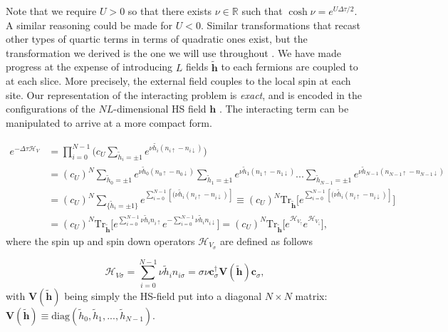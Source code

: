 Note that we require $U > 0$ so that there exists $\nu \in \mathbb{R}$ such that $\cosh \nu = e^{U\Delta \tau / 2}$. A similar reasoning could be made for $U < 0$.
Similar transformations that recast other types of quartic terms in terms of quadratic ones exist, but the transformation we derived is the one we will use throughout \cite{hirsch_monte_1983}.
We have made progress at the expense of introducing $L$ fields $\widetilde{\bm h}$ to each fermions are coupled to at each slice.
More precisely, the external field couples to the local spin at each site.
Our representation of the interacting problem is \emph{exact}, and is encoded in the configurations of the $NL$-dimensional HS field $\bm h$  \cite{hou_numerical_2009}.
The interacting term can be manipulated to arrive at a more compact form.

\begin{equation}\label{eq:exp_quartic}
\begin{split}
e^{-\Delta\tau \mathcal{H}_V} &= \prod_{i=0}^{N-1} \bigg( c_U \sum_{\widetilde{h}_i = \pm 1} e^{\nu \widetilde{h_i} ( n_{i\uparrow} - n_{i\downarrow} )} \bigg) \\
&=  (c_U)^N \sum_{\widetilde{h}_0 = \pm 1} e^{\nu \widetilde{h}_0 ( n_{0\uparrow} - n_{0\downarrow} )} \sum_{\widetilde{h}_1 = \pm 1} e^{\nu \widetilde{h}_1 ( n_{1\uparrow} - n_{1\downarrow} )} ... \sum_{\widetilde{h}_{N-1} = \pm 1} e^{\nu \widetilde{h}_{N-1} ( n_{N-1\uparrow} - n_{N-1\downarrow} )} \\
&= (c_U)^N \sum_{ \{ \widetilde{h}_i = \pm 1 \}} e^{\sum_{i=0}^{N-1} [(\nu \widetilde{h}_i ( n_{i\uparrow} - n_{i\downarrow} ) ]} \equiv (c_U)^N \text{Tr}_{\widetilde{\bm h}} \bigg[ e^{\sum_{i=0}^{N-1} [(\nu \widetilde{h}_i ( n_{i\uparrow} - n_{i\downarrow} ) ]} \bigg] \\
&= (c_U)^N \text{Tr}_{\widetilde{\bm h}} \bigg[ e^{\sum_{i=0}^{N-1} \nu \widetilde{h}_i n_{i\uparrow}} e^{-\sum_{i=0}^{N-1} \nu \widetilde{h}_i n_{i\downarrow}} \bigg] = (c_U)^N \text{Tr}_{\widetilde{\bm h}} \bigg[ e^{\mathcal{H}_{V_\uparrow}} e^{\mathcal{H}_{V_\downarrow}} \bigg] ,
\end{split}
\end{equation}
where the spin up and spin down operators $\mathcal{H}_{V_\sigma}$ are defined as follows

\begin{equation}
\mathcal{H}_{V\sigma} = \sum_{i=0}^{N-1} \nu \widetilde{h}_i n_{i\sigma} = \sigma \nu \bm c_\sigma^\dagger \bm V(\widetilde{\bm h}) \bm c_\sigma,
\end{equation}
with $\bm V(\widetilde{\bm h})$ being simply the HS-field put into a diagonal $N\times N$ matrix: $\bm V(\widetilde{\bm h}) \equiv \text{diag}(\widetilde{h}_0, \widetilde{h}_1, ..., \widetilde{h}_{N-1})$.

